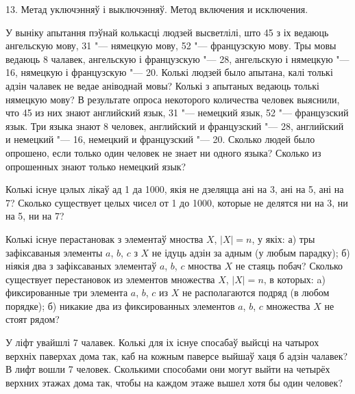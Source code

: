 



\biLangHeader
{13. Метад уключэнняў і выключэнняў.}
{Метод включения и исключения.}

\begin{problemList}

\problemItemSimple
{У выніку апытання пэўнай колькасці людзей высветлілі, што 45 з іх
ведаюць ангельскую мову, 31 "--- нямецкую мову, 52 "--- французскую мову.
Тры мовы ведаюць 8 чалавек, ангельскую і французскую "--- 28, ангельскую і нямецкую "--- 16,
нямецкую і французскую "--- 20. Колькі людзей было апытана, калі толькі адзін чалавек не ведае
аніводнай мовы? Колькі з апытаных ведаюць толькі нямецкую мову?}
{В результате опроса некоторого количества человек выяснили, что 45
из них знают английский язык, 31 "--- немецкий язык, 52 "--- французский язык.
Три языка знают 8 человек, английский и французский "--- 28, английский и
немецкий "--- 16, немецкий и французский "--- 20. Сколько людей было опрошено,
если только один человек не знает ни одного языка? Сколько из опрошенных
знают только немецкий язык?}

\bigskip

\problemItemSimple
{Колькі існуе цэлых лікаў ад 1 да 1000, якія не дзеляцца ані на 3, ані на 5, ані на 7?}
{Сколько существует целых чисел от 1 до 1000, которые не делятся ни
на 3, ни на 5, ни на 7?}

\bigskip

\problemItemSimple
{Колькі існуе перастановак з элементаў мноства $X$, $|X| = n$, у якіх:
а) тры зафіксаваныя элементы $a$, $b$, $c$ з $X$ не ідуць адзін за адным (у любым парадку);
б) ніякія два з зафіксаваных элементаў $a$, $b$, $c$ мноства $X$ не стаяць побач?}
{Сколько существует перестановок из элементов множества $X$, $|X| = n$,
в которых: a) фиксированные три элемента $a$, $b$, $c$ из $X$ не располагаются
подряд (в любом порядке); б) никакие два из фиксированных элементов $a$, $b$, $c$
множества $X$ не стоят рядом?}

\bigskip

\problemItemSimple
{У ліфт увайшлі 7 чалавек. Колькі для іх існуе спосабаў выйсці на чатырох верхніх паверхах дома так,
каб на кожным паверсе выйшаў хаця б адзін чалавек?}
{В лифт вошли 7 человек. Сколькими способами они могут выйти на четырёх
верхних этажах дома так, чтобы на каждом этаже вышел хотя бы один человек?}

\bigskip


\end{problemList}
